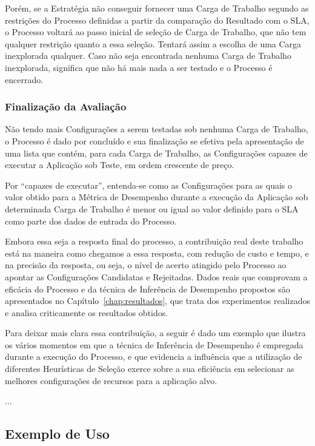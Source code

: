 \documentclass[12pt]{article}
\begin{document}
Porém, se a Estratégia não conseguir fornecer uma Carga de Trabalho segundo as 
restrições do Processo definidas a partir da comparação do Resultado com o SLA, o Processo 
voltará ao passo inicial de seleção de Carga de Trabalho, que não tem qualquer 
restrição quanto a essa seleção. Tentará assim a escolha de uma Carga inexplorada
qualquer. Caso não seja encontrada nenhuma Carga de Trabalho inexplorada, significa
que não há mais nada a ser testado e o Processo é encerrado.

\subsubsection{Finalização da Avaliação}
Não tendo mais Configurações a serem testadas sob nenhuma Carga de Trabalho, o 
Processo é dado por concluído e sua finalização se efetiva pela apresentação de uma
lista que contém, para cada Carga de Trabalho, as Configurações capazes de executar
a Aplicação sob Teste, em ordem crescente de preço.

Por ``capazes de executar'', entenda-se como as Configurações para as quais o valor
obtido para a Métrica de Desempenho durante a execução da Aplicação sob determinada
Carga de Trabalho é menor ou igual ao valor definido para o SLA
como parte dos dados de entrada do Processo.

Embora essa seja a resposta final do processo, a contribuição real deste trabalho está
na maneira como chegamos a essa resposta, com redução de custo e tempo, e na precisão 
da resposta, ou seja, o nível de acerto atingido pelo Processo ao apontar as Configurações
Candidatas e Rejeitadas. Dados reais que comprovam a eficácia do 
Processo e da técnica de Inferência de Desempenho propostos são apresentados no
Capítulo~\ref{chap:resultados}, que trata dos experimentos realizados e analisa criticamente os resultados obtidos.

Para deixar mais clara essa contribuição, a seguir é dado um exemplo que ilustra os vários momentos
em que a técnica de Inferência de Desempenho é empregada durante a execução do Processo, e que evidencia a influência que a utilização de diferentes Heurísticas de Seleção exerce sobre a sua eficiência em selecionar as melhores configurações de recursos para a aplicação alvo.

...



\subsection{Exemplo de Uso}
\end{document}
